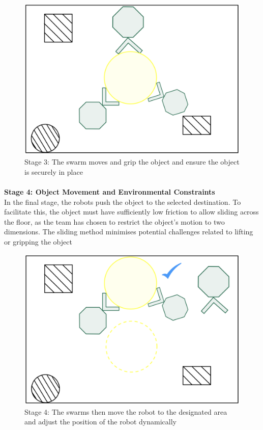 \begin{figure}
    \centering
    \includegraphics[width=0.5\linewidth]{assets/images/project_outcome/stage_3.png}
    \caption{Stage 3: The swarm moves and grip the object and ensure the object is securely in place}
    \label{fig:phase3}
\end{figure}

\paragraph*{}
\textbf{Stage 4: Object Movement and Environmental Constraints} \\
In the final stage, the robots push the object to the selected destination. To facilitate this, the object must have sufficiently low friction to allow sliding across the floor, as the team has chosen to restrict the object’s motion to two dimensions. The sliding method minimises potential challenges related to lifting or gripping the object

\begin{figure}
    \centering
    \includegraphics[width=0.5\linewidth]{assets/images/project_outcome/stage_4.png}
    \caption{Stage 4: The swarms then move the robot to the designated area and adjust the position of the robot dynamically}
    \label{fig:phase4}
\end{figure}
